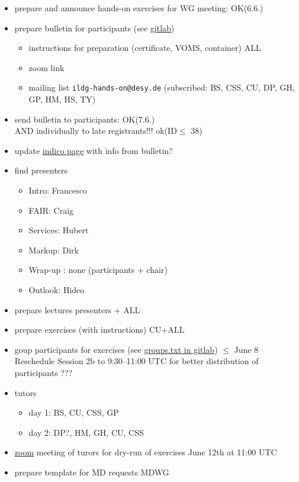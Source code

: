 \documentclass{article}
\begin{document}
\begin{itemize}
    \item prepare and announce hands-on exercises for WG meeting: OK(6.6.)
    \item prepare bulletin for participants (see     \href{https://gitlab.desy.de/ildg/hands-on/organization/-/blob/main/bulletin1.txt}{gitlab})
    \begin{itemize}
        \item instructions for preparation (certificate, VOMS, container) \hfill ALL
        \item zoom link 
        \item mailing list {\tt ildg-hands-on@desy.de} (subscribed: BS, CSS, CU, DP, GH, GP, HM, HS, TY)
        \end{itemize}
    \item send bulletin to participants: OK(7.6.)\\
    AND individually to late registrants!!! \hfill ok(ID$\le$ 38)
    \item update \href{https://indico.desy.de/event/39311/} {indico page} with info from bulletin?
    \item find presenters
    \begin{itemize}
        \item Intro: Francesco
        \item FAIR: Craig
        \item Services: Hubert
        \item Markup: Dirk
        \item Wrap-up   : none (participants + chair)
        \item Outlook: Hideo
    \end{itemize}
    \item prepare lectures \hfill presenters + ALL
    \item prepare exercises (with instructions) \hfill CU+ALL
    \item goup participants for exercises (see 
    \href{https://gitlab.desy.de/ildg/hands-on/organization/-/blob/main/groups.txt}{groups.txt in gitlab})
    \hfill $\le$ June 8\\
      Reschedule Session 2b to 9:30--11:00 UTC for better distribution of participants ???
    \item tutors
    \begin{itemize}
        \item day 1: BS, CU, CSS, GP
        \item day 2: DP?, HM, GH, CU, CSS
    \end{itemize}
    \item \href{https://uni-bielefeld.zoom.us/j/67037400662?pwd=TTJ2WTYzMXZnVXVwdndYK2V1bU1kZz09}{zoom} meeting of turors for dry-run of exercises
    \hfill{June 12th at 11:00 UTC}\\
    \item prepare template for MD requests \hfill MDWG 
\end{itemize}
\end{document}
